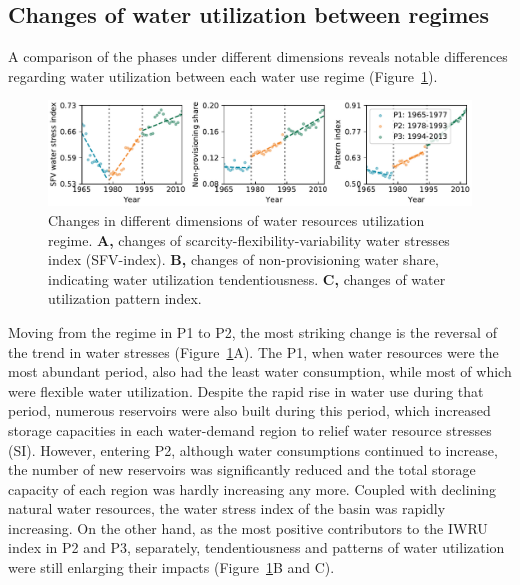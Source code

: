 \documentclass[9pt, twocolumn, twoside, lineno]{pnas-new}
\begin{document}
\subsection*{Changes of water utilization between regimes}
A comparison of the phases under different dimensions reveals notable differences regarding water utilization
between each water use regime (Figure~\ref{fig:dimensions}).
\begin{figure}%
	\centering
	\includegraphics[width=\linewidth]{../../figures/main_text/dimensions.pdf}
	\caption{
		Changes in different dimensions of water resources utilization regime.
		\textbf{A,} changes of scarcity-flexibility-variability water stresses index (SFV-index).
		\textbf{B,} changes of non-provisioning water share, indicating water utilization tendentiousness.
		\textbf{C,} changes of water utilization pattern index.
		}
	\label{fig:dimensions}
\end{figure}
Moving from the regime in P1 to P2, the most striking change is the reversal of the trend in water stresses (Figure~\ref{fig:dimensions}A).
The P1, when water resources were the most abundant period, also had the least water consumption, 
while most of which were flexible water utilization.
Despite the rapid rise in water use during that period, numerous reservoirs were also built during this period, 
which increased storage capacities in each water-demand region to relief water resource stresses (SI).
However, entering P2, although water consumptions continued to increase, 
the number of new reservoirs was significantly reduced and the total storage capacity of each region was hardly increasing any more. 
Coupled with declining natural water resources, the water stress index of the basin was rapidly increasing.
On the other hand, as the most positive contributors to the IWRU index in P2 and P3, separately, 
tendentiousness and patterns of water utilization were still enlarging their impacts (Figure~\ref{fig:dimensions}B and C). 
\end{document}
